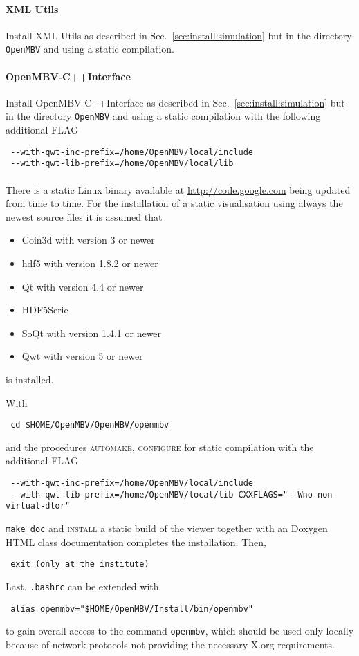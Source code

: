 \paragraph{XML Utils}
Install XML Utils as described in Sec.~\ref{sec:install:simulation} but in the directory \texttt{OpenMBV} and using a static compilation.

\paragraph{OpenMBV-C++Interface}
Install OpenMBV-C++Interface as described in Sec.~\ref{sec:install:simulation} but in the directory \texttt{OpenMBV} and using a static compilation with the following additional FLAG
\begin{verbatim}
 --with-qwt-inc-prefix=/home/OpenMBV/local/include 
 --with-qwt-lib-prefix=/home/OpenMBV/local/lib
\end{verbatim}

\paragraph{\OpenMBV{}}
There is a static Linux binary available at \url{http://code.google.com} being updated from time to time. For the installation of a static visualisation using always the newest source files it is assumed that
\begin{itemize}
\item Coin3d with version 3 or newer 
\item hdf5 with version 1.8.2 or newer 
\item Qt with version 4.4 or newer 
\item HDF5Serie 
\item SoQt with version 1.4.1 or newer 
\item Qwt with version 5 or newer 
\end{itemize}
is installed.\par
With
\begin{verbatim}
 cd $HOME/OpenMBV/OpenMBV/openmbv
\end{verbatim} 
and the procedures \textsc{automake, configure} for static compilation with the additional FLAG
\begin{verbatim}
 --with-qwt-inc-prefix=/home/OpenMBV/local/include 
 --with-qwt-lib-prefix=/home/OpenMBV/local/lib CXXFLAGS="--Wno-non-virtual-dtor" 
\end{verbatim}
\texttt{make doc} and \textsc{install} a static build of the viewer together with an Doxygen HTML class documentation completes the installation. Then,
\begin{verbatim}
 exit (only at the institute)
\end{verbatim}
Last, \texttt{.bashrc} can be extended with
\begin{verbatim}
 alias openmbv="$HOME/OpenMBV/Install/bin/openmbv"
\end{verbatim}
to gain overall access to the command \texttt{openmbv}, which should be used only locally because of network protocols not providing the necessary X.org requirements.

